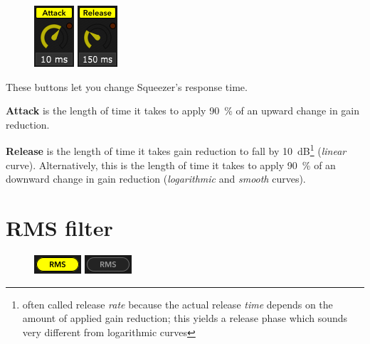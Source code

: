 \begin{figure}
  \includegraphics[scale=\screenshotscale,clip]{include/images/knob_attack_time.png}
  \includegraphics[scale=\screenshotscale,clip]{include/images/knob_release_time.png}
\end{figure}

These buttons let you change Squeezer's response time.

\textbf{Attack} is the length of time it takes to apply
\SI{90}{\percent} of an upward change in gain reduction.

\textbf{Release} is the length of time it takes gain reduction to fall
by \SI{10}{\dB}\footnote{often called release \emph{rate} because the
  actual release \emph{time} depends on the amount of applied gain
  reduction; this yields a release phase which sounds very different
  from logarithmic curves} (\emph{linear} curve).  Alternatively, this
is the length of time it takes to apply \SI{90}{\percent} of an
downward change in gain reduction (\emph{logarithmic} and
\emph{smooth} curves).

\section{RMS filter}

\begin{figure}
  \includegraphics[scale=\screenshotscale,clip]{include/images/button_rms_on.png}
  \newline \vspace{-0.9\baselineskip}
  \includegraphics[scale=\screenshotscale,clip]{include/images/button_rms_off.png}
\end{figure}

